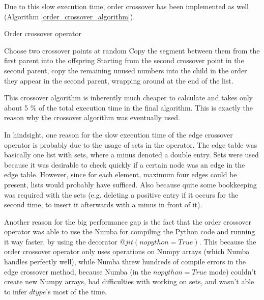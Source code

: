\documentclass[a4paper,10pt]{article}
\begin{document}
Due to this slow execution time, order crossover \cite{eiben_smith} has been implemented as well (Algorithm \ref{order_crossover_algorithm}).

\begin{algorithm}
\caption{Order crossover operator \cite{eiben_smith}}\label{order_crossover_algorithm}
\begin{algorithmic}
\State Choose two crossover points at random
\State Copy the segment between them from the first parent into the offspring
\State Starting from the second crossover point in the second parent, copy the remaining unused numbers into the child in the order they appear in the second parent, wrapping around at the end of the list.
\end{algorithmic}
\end{algorithm}

This crossover algorithm is inherently much cheaper to calculate and takes only about 5 \% %
of the total execution time in the final algorithm. This is exactly the reason why the crossover algorithm was eventually used. 

In hindsight, one reason for the slow execution time of the edge crossover operator is probably due to the usage of sets in the operator. The edge table was basically one list with sets, where a minus denoted a double entry. Sets were used because it was desirable to check quickly if a certain node was an edge in the edge table. However, since for each element, maximum four edges could be present, lists would probably have sufficed. Also because quite some bookkeeping was required with the sets (e.g. deleting a positive entry if it occurs for the second time, to insert it afterwards with a minus in front of it). 

Another reason for the big performance gap is the fact that the order crossover operator was able to use the Numba for compiling the Python code and running it way faster, by using the decorator $@jit(nopython=True)$. This because the order crossover operator only uses operations on Numpy arrays (which Numba handles perfectly well), while Numba threw hundreds of compile errors in the edge crossover method, because Numba (in the $nopython=True$ mode) couldn't create new Numpy arrays, had difficulties with working on sets, and wasn't able to infer $dtype$'s most of the time.

\end{document}
